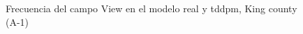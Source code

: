 \begin{figure}[H]
    \centering
    
    \caption{Frecuencia del campo View en el modelo real y tddpm, King county (A-1)}
    \label{frecuency-tddpm-view}
\end{figure}